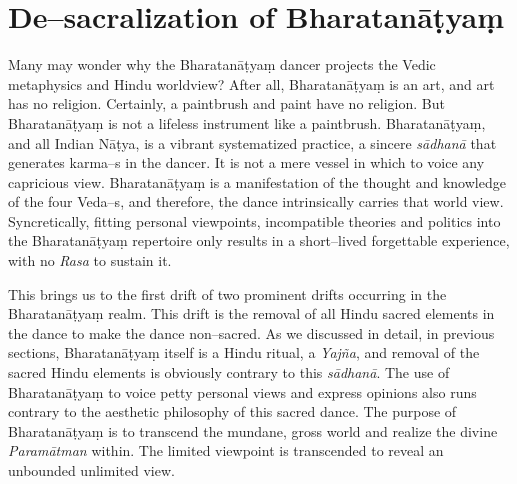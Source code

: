 \section*{De–sacralization of Bharatanāṭyaṃ}

Many may wonder why the Bharatanāṭyaṃ dancer projects the Vedic metaphysics and Hindu worldview? After all, Bharatanāṭyaṃ is an art, and art has no religion. Certainly, a paintbrush and paint have no religion. But Bharatanāṭyaṃ is not a lifeless instrument like a paintbrush. Bharatanāṭyaṃ, and all Indian Nāṭya, is a vibrant systematized practice, a sincere \textit{sādhanā} that generates karma–s in the dancer. It is not a mere vessel in which to voice any capricious view. Bharatanāṭyaṃ is a manifestation of the thought and knowledge of the four Veda–s, and therefore, the dance intrinsically carries that world view. Syncretically, fitting personal viewpoints, incompatible theories and politics into the Bharatanāṭyaṃ repertoire only results in a short–lived forgettable experience, with no \textit{Rasa} to sustain it.

This brings us to the first drift of two prominent drifts occurring in the Bharatanāṭyaṃ realm. This drift is the removal of all Hindu sacred elements in the dance to make the dance non–sacred. As we discussed in detail, in previous sections, Bharatanāṭyaṃ itself is a Hindu ritual, a \textit{Yajña}, and removal of the sacred Hindu elements is obviously contrary to this \textit{sādhanā}. The use of Bharatanāṭyaṃ to voice petty personal views and express opinions also runs contrary to the aesthetic philosophy of this sacred dance. The purpose of Bharatanāṭyaṃ is to transcend the mundane, gross world and realize the divine \textit{Paramātman} within. The limited viewpoint is transcended to reveal an unbounded unlimited view.

